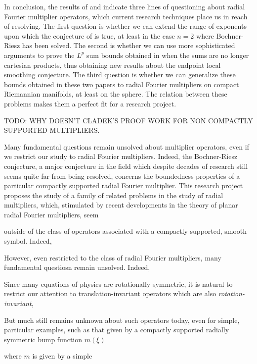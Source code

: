 \documentclass[12pt]{article}
\theoremstyle{plain}
\theoremstyle{remark}
\theoremstyle{definition}
\begin{document}
In conclusion, the results of \cite{HeoandNazarovandSeeger} and \cite{Cladek} indicate three lines of questioning about radial Fourier multiplier operators, which current research techniques place us in reach of resolving. The first question is whether we can extend the range of exponents upon which the conjecture of \cite{GarrigosandSeeger} is true, at least in the case $n = 2$ where Bochner-Riesz has been solved. The second is whether we can use more sophisticated arguments to prove the $L^p$ sum bounds obtained in \cite{Cladek} when the sums are no longer cartesian products, thus obtaining new results about the endpoint local smoothing conjecture. The third question is whether we can generalize these bounds obtained in these two papers to radial Fourier multipliers on compact Riemannian manifolds, at least on the sphere. The relation between these problems makes them a perfect fit for a research project.



\newpage

TODO: WHY DOESN'T CLADEK'S PROOF WORK FOR NON COMPACTLY SUPPORTED MULTIPLIERS.

Many fundamental questions remain unsolved about multiplier operators, even if we restrict our study to radial Fourier multipliers. Indeed, the Bochner-Riesz conjecture, a major conjecture in the field which despite decades of research still seems quite far from being resolved, concerns the boundedness properties of a particular compactly supported radial Fourier multiplier. This research project proposes the study of a family of related problems in the study of radial multipliers, which, stimulated by recent developments in the theory of planar radial Fourier multipliers, seem 

outside of the class of operators associated with a compactly supported, smooth symbol. Indeed, 

However, even restricted to the class of radial Fourier multipliers, many fundamental questiosn remain unsolved. Indeed, 

Since many equations of physics are rotationally symmetric, it is natural to restrict our attention to translation-invariant operators which are also \emph{rotation-invariant}, 


But much still remains unknown about such operators today, even for simple, particular examples, such as that given by a compactly supported radially symmetric bump function $m(\xi)$

 where $m$ is given by a simple 
\end{document}
